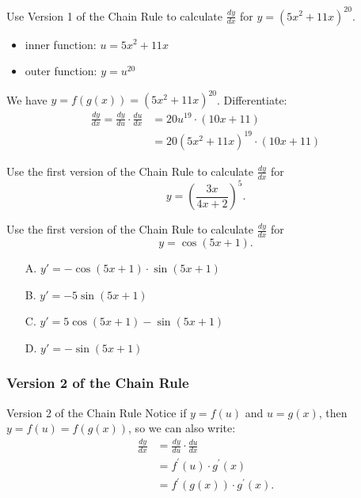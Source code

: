 \documentclass[cal1spr16Lectures.tex]{subfiles}
\begin{document}
\begin{frame}\footnotesize
\begin{ex} Use Version 1 of the Chain Rule to calculate $\textstyle\frac{dy}{dx}$ for $y=(5x^2 +11x)^{20}$. \end{ex}
\begin{itemize}
\item inner function: $u=5x^2+11x$ 
\item outer function: $y=u^{20}$
\end{itemize}

\vspace{1pc}
We have $y = f(g(x)) = (5x^2 +11x)^{20}$.  Differentiate:
\begin{align*} 
\frac{dy}{dx}= \frac{dy}{du}\cdot\frac{du}{dx} &= 20u^{19} \cdot (10x+11) \\
 &=20(5x^2 +11x)^{19} \cdot (10x+11)
\end{align*}
\end{frame}

\begin{frame}
\begin{exe} Use the first version of the Chain Rule to calculate $\textstyle\frac{dy}{dx}$ for 
\[y=\left( \frac{3x}{4x+2} \right)^5.\]
\end{exe}
\end{frame}

\begin{frame}
\begin{exe}
Use the first version of the Chain Rule to calculate $\textstyle\frac{dy}{dx}$ for
\[
y=\cos{(5x+1).}
\]
\begin{itemize}
\item[A. ] $y'=-\cos{(5x+1)}\cdot\sin{(5x+1)}$
\item[B. ] $y'=-5\sin{(5x+1)}$
\item[C. ] $y'=5\cos{(5x+1)}-\sin{(5x+1)}$
\item[D. ] $y'=-\sin{(5x+1)}$
\end{itemize}
\end{exe}
\end{frame}

\subsubsection{Version 2 of the Chain Rule}

\begin{frame}{\small Version 2 of the Chain Rule}
Notice if $y=f(u)$ and $u=g(x)$, then $y=f(u)=f(g(x))$, so we can also write:
\begin{align*}
\frac{dy}{dx} &= \frac{dy}{du} \cdot \frac{du}{dx} \\[0.75pc]
 &= f^{\prime}(u) \cdot g^{\prime}(x) \\[0.75pc]
 &= f^{\prime}(g(x)) \cdot g^{\prime}(x).
\end{align*}
\end{frame}
\end{document}
